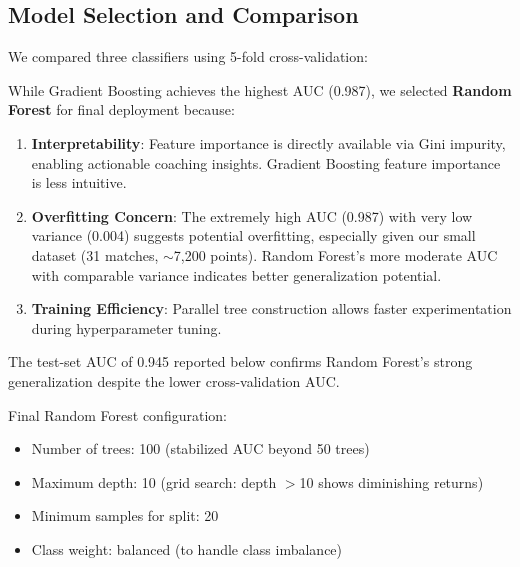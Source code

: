 \documentclass{mcmthesis}
\begin{document}
\subsection{Model Selection and Comparison}

We compared three classifiers using 5-fold cross-validation:

\begin{table}[H]
\centering
\caption{Model comparison (5-fold CV AUC).}
\label{tab:model_comparison}
\end{table}

While Gradient Boosting achieves the highest AUC (0.987), we selected \textbf{Random Forest} for final deployment because:
\begin{enumerate}
    \item \textbf{Interpretability}: Feature importance is directly available via Gini impurity, enabling actionable coaching insights. Gradient Boosting feature importance is less intuitive.
    \item \textbf{Overfitting Concern}: The extremely high AUC (0.987) with very low variance (0.004) suggests potential overfitting, especially given our small dataset (31 matches, $\sim$7,200 points). Random Forest's more moderate AUC with comparable variance indicates better generalization potential.
    \item \textbf{Training Efficiency}: Parallel tree construction allows faster experimentation during hyperparameter tuning.
\end{enumerate}
The test-set AUC of 0.945 reported below confirms Random Forest's strong generalization despite the lower cross-validation AUC.

Final Random Forest configuration:
\begin{itemize}
    \item Number of trees: 100 (stabilized AUC beyond 50 trees)
    \item Maximum depth: 10 (grid search: depth $>$10 shows diminishing returns)
    \item Minimum samples for split: 20
    \item Class weight: balanced (to handle class imbalance)
\end{itemize}
\end{document}
